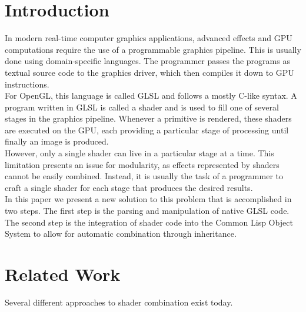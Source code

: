 \documentclass[format=sigconf]{acmart}
\begin{document}

\maketitle

\newpage

\def\abovecaptionskip{1pt}
\def\listingautorefname{listing}
\def\figureautorefname{figure}

\section{Introduction}\label{section:1}
In modern real-time computer graphics applications, advanced effects and GPU computations require the use of a programmable graphics pipeline. This is usually done using domain-specific languages. The programmer passes the programs as textual source code to the graphics driver, which then compiles it down to GPU instructions.\\

For OpenGL, this language is called GLSL\cite{rost2009opengl} and follows a mostly C-like syntax. A program written in GLSL is called a shader and is used to fill one of several stages in the graphics pipeline. Whenever a primitive is rendered, these shaders are executed on the GPU, each providing a particular stage of processing until finally an image is produced. \\

However, only a single shader can live in a particular stage at a time. This limitation presents an issue for modularity, as effects represented by shaders cannot be easily combined. Instead, it is usually the task of a programmer to craft a single shader for each stage that produces the desired results. \\

In this paper we present a new solution to this problem that is accomplished in two steps. The first step is the parsing and manipulation of native GLSL code. The second step is the integration of shader code into the Common Lisp Object System to allow for automatic combination through inheritance.

\section{Related Work}\label{section:2}
Several different approaches to shader combination exist today. \\
\end{document}
